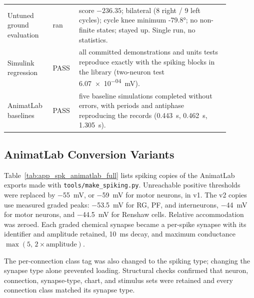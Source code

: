 \begin{table}
\begin{tabular}{@{}p{0.16\linewidth}p{0.10\linewidth}p{0.62\linewidth}@{}}
Untuned ground evaluation & ran & score $-236.35$; bilateral (8 right / 9 left cycles); cycle knee minimum \ang{-79.8}; no non-finite states; stayed up. Single run, no statistics. \\
Simulink regression & PASS & all committed demonstrations and units tests reproduce exactly with the spiking blocks in the library (two-neuron test \qty{6.07e-04}{\mV}). \\
AnimatLab baselines & PASS & five baseline simulations completed without errors, with periods and antiphase reproducing the records (\qty{0.443}{\second}, \qty{0.462}{\second}, \qty{1.305}{\second}). \\
\bottomrule
\end{tabular}
\end{table}

\subsection{AnimatLab Conversion Variants}

Table~\ref{tab:app_spk_animatlab_full} lists spiking copies of the AnimatLab exports made with \nolinkurl{tools/make_spiking.py}. Unreachable positive thresholds were replaced by \qty{-55}{\mV}, or \qty{-59}{\mV} for motor neurons, in v1. The v2 copies use measured graded peaks: \qty{-53.5}{\mV} for RG, PF, and interneurons, \qty{-44}{\mV} for motor neurons, and \qty{-44.5}{\mV} for Renshaw cells. Relative accommodation was zeroed. Each graded chemical synapse became a per-spike synapse with its identifier and amplitude retained, \qty{10}{\ms} decay, and maximum conductance $\max(5,\,2\times\text{amplitude})$.

The per-connection class tag was also changed to the spiking type; changing the synapse type alone prevented loading. Structural checks confirmed that neuron, connection, synapse-type, chart, and stimulus sets were retained and every connection class matched its synapse type.

